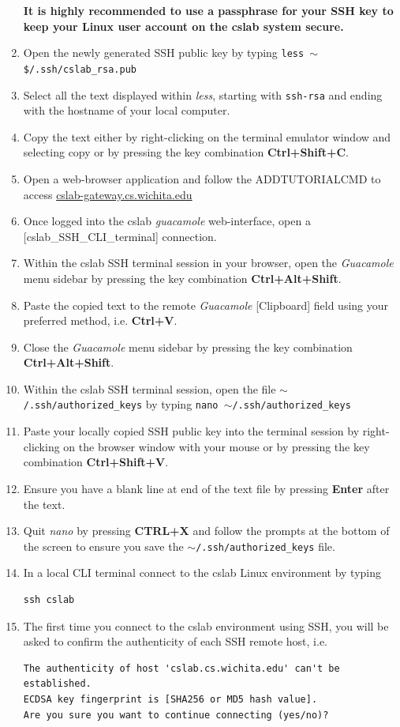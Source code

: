 \documentclass[12pt]{article}
\begin{document}
\begin{flushleft}
\begin{enumerate}
      \textbf{It is highly recommended to use a passphrase for your SSH key to keep your Linux user account on the cslab system secure.}
 
  \item Open the newly generated SSH public key by typing \break
  \texttt{less $\sim$\$/.ssh/cslab\_rsa.pub}
  \item Select all the text displayed within \textit{less}, starting with \texttt{ssh-rsa} and ending with the hostname of your local computer.
  \item Copy the text either by right-clicking on the terminal emulator window and selecting copy or by pressing the key combination \textbf{Ctrl+Shift+C}.
  \item Open a web-browser application and follow the ADDTUTORIALCMD to access \href{https://cslab-gateway.cs.wichita.edu/}{cslab-gateway.cs.wichita.edu}
  \item Once logged into the cslab \textit{guacamole} web-interface, open a [cslab\_SSH\_CLI\_terminal] connection.
  \item Within the cslab SSH terminal session in your browser, open the \textit{Guacamole} menu sidebar by pressing the key combination \textbf{Ctrl+Alt+Shift}.
  \item Paste the copied text to the remote \textit{Guacamole} [Clipboard] field using your preferred method, i.e. \textbf{Ctrl+V}.
  \item Close the \textit{Guacamole} menu sidebar by pressing the key combination \textbf{Ctrl+Alt+Shift}.
  \item Within the cslab SSH terminal session, open the file \texttt{$\sim$/.ssh/authorized\_keys} by typing \break
  \texttt{nano $\sim$/.ssh/authorized\_keys}
  \item Paste your locally copied SSH public key into the terminal session by right-clicking on the browser window with your mouse or by pressing the key combination \textbf{Ctrl+Shift+V}.
  \item Ensure you have a blank line at end of the text file by pressing \textbf{Enter} after the text.
  \item Quit \textit{nano} by pressing \textbf{CTRL+X} and follow the prompts at the bottom of the screen to ensure you save the \texttt{$\sim$/.ssh/authorized\_keys} file.

    
  \item In a local CLI terminal connect to the cslab Linux environment by typing
\begin{verbatim}
ssh cslab
\end{verbatim}
\item The first time you connect to the cslab environment using SSH, you will be asked to confirm the authenticity of each SSH remote host, i.e.
\begin{verbatim}
The authenticity of host 'cslab.cs.wichita.edu' can't be established.
ECDSA key fingerprint is [SHA256 or MD5 hash value].
Are you sure you want to continue connecting (yes/no)?
\end{verbatim}


\end{enumerate}
\end{flushleft}
\end{document}
